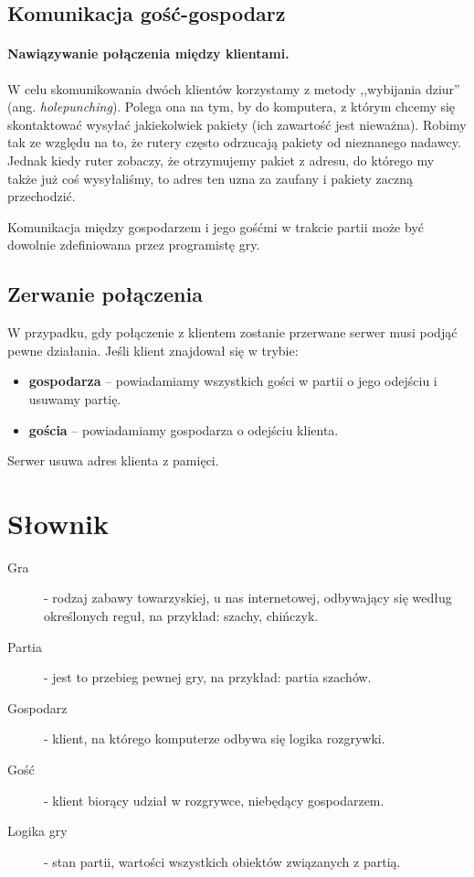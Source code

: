 \documentclass[a4paper, 12pt]{article}
\begin{document}
\subsection{Komunikacja gość-gospodarz}

\paragraph{Nawiązywanie połączenia między klientami.} W celu skomunikowania dwóch klientów korzystamy z metody ,,wybijania dziur'' (ang. \textit{holepunching}). Polega ona na tym, by do komputera, z którym chcemy się skontaktować wysyłać jakiekolwiek pakiety (ich zawartość jest nieważna). Robimy tak ze względu na to, że rutery często odrzucają pakiety od nieznanego nadawcy. Jednak kiedy ruter zobaczy, że otrzymujemy pakiet z adresu, do którego my także już coś wysyłaliśmy, to adres ten uzna za zaufany i pakiety zaczną przechodzić. 

Komunikacja między gospodarzem i jego gośćmi w trakcie partii może być dowolnie zdefiniowana przez programistę gry.

\subsection{Zerwanie połączenia}
W przypadku, gdy połączenie z klientem zostanie przerwane serwer musi podjąć pewne działania. Jeśli klient znajdował się w trybie:
\begin{itemize}
 \item \textbf{gospodarza} -- powiadamiamy wszystkich gości w partii o jego odejściu i usuwamy partię.
 \item \textbf{gościa} -- powiadamiamy gospodarza o odejściu klienta.
\end{itemize}
Serwer usuwa adres klienta z pamięci.


\section{Słownik}
\begin{description}
 \item[Gra] - rodzaj zabawy towarzyskiej, u nas internetowej, odbywający się według określonych reguł, na przykład: szachy, chińczyk.
 \item[Partia] - jest to przebieg pewnej gry, na przykład: partia szachów.
 \item[Gospodarz] - klient, na którego komputerze odbywa się logika rozgrywki.
 \item[Gość] - klient biorący udział w rozgrywce, niebędący gospodarzem.
 \item[Logika gry] - stan partii, wartości wszystkich obiektów związanych z partią.
\end{description}
\end{document}
